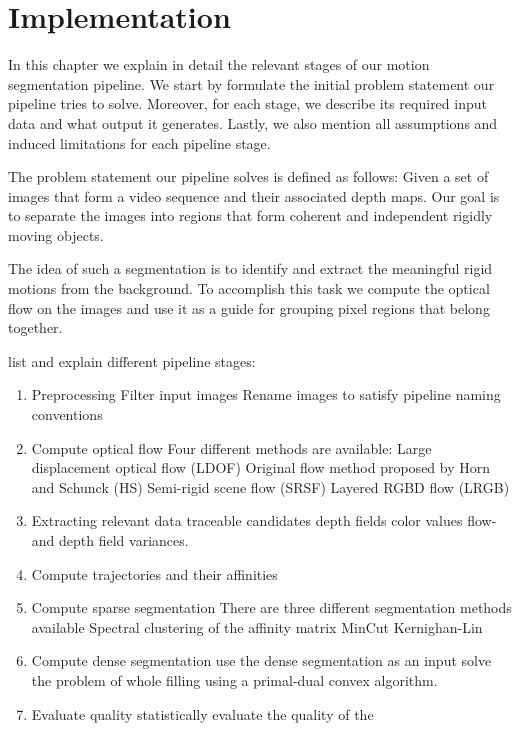 \chapter{Implementation}
In this chapter we explain in detail the relevant stages of our motion segmentation pipeline. We start by formulate the initial problem statement our pipeline tries to solve. Moreover, for each stage, we describe its required input data and what output it generates. Lastly, we also mention all assumptions and induced limitations for each pipeline stage. 

The problem statement our pipeline solves is defined as follows: 
Given a set of images that form a video sequence and their associated depth maps. Our goal is to separate the images into regions that form coherent and independent rigidly moving objects. 


The idea of such a segmentation is to identify and extract the meaningful rigid motions from the background. To accomplish this task we compute the optical flow on the images and use it as a guide for grouping pixel regions that belong together. 





list and explain different pipeline stages:

\begin{enumerate}
\item Preprocessing
	\subitem Filter input images
	\subitem Rename images to satisfy pipeline naming conventions 
\item Compute optical flow
	\subitem Four different methods are available:
	\subitem Large displacement optical flow (LDOF)
	\subitem Original flow method proposed by Horn and Schunck (HS)
	\subitem Semi-rigid scene flow (SRSF)
	\subitem Layered RGBD flow (LRGB)
\item Extracting relevant data
	\subitem traceable candidates
	\subitem depth fields
	\subitem color values
	\subitem flow-and depth field variances.
\item Compute trajectories and their affinities
\item Compute sparse segmentation
	\subitem There are three different segmentation methods available
	\subitem Spectral clustering of the affinity matrix
	\subitem MinCut
	\subitem Kernighan-Lin 
\item Compute dense segmentation
	\subitem use the dense segmentation as an input solve the problem of whole filling using a primal-dual convex algorithm. 
\item Evaluate quality
	\subitem statistically evaluate the quality of the  
\end{enumerate}


